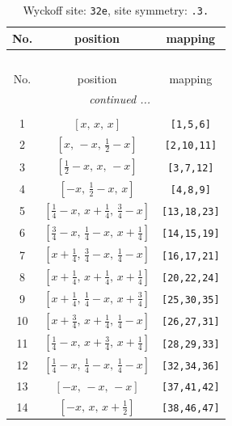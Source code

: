 \documentclass[fleqn,8pt]{jsarticle}
\begin{document}
\renewcommand{\arraystretch}{1.2}
\begin{longtable}{ccc}
\caption{Wyckoff site: {\tt 32e}, site symmetry: {\tt .3.}}
 \\
 \hline \hline
No. & position & mapping \\ \hline \endfirsthead

\multicolumn{2}{l}{\tablename\ \thetable{}} \\
 \hline \hline
No. & position & mapping \\ \hline \endhead

 \hline \hline
\multicolumn{2}{r}{\footnotesize\it continued ...} \\ \endfoot

 \hline \hline
\multicolumn{2}{r}{} \\ \endlastfoot

1 & $\left[ x,\, x,\, x \right]$ & {\tt [1,5,6]} \\ \hline
2 & $\left[ x,\, - x,\, \frac{1}{2} - x \right]$ & {\tt [2,10,11]} \\ \hline
3 & $\left[ \frac{1}{2} - x,\, x,\, - x \right]$ & {\tt [3,7,12]} \\ \hline
4 & $\left[ - x,\, \frac{1}{2} - x,\, x \right]$ & {\tt [4,8,9]} \\ \hline
5 & $\left[ \frac{1}{4} - x,\, x + \frac{1}{4},\, \frac{3}{4} - x \right]$ & {\tt [13,18,23]} \\ \hline
6 & $\left[ \frac{3}{4} - x,\, \frac{1}{4} - x,\, x + \frac{1}{4} \right]$ & {\tt [14,15,19]} \\ \hline
7 & $\left[ x + \frac{1}{4},\, \frac{3}{4} - x,\, \frac{1}{4} - x \right]$ & {\tt [16,17,21]} \\ \hline
8 & $\left[ x + \frac{1}{4},\, x + \frac{1}{4},\, x + \frac{1}{4} \right]$ & {\tt [20,22,24]} \\ \hline
9 & $\left[ x + \frac{1}{4},\, \frac{1}{4} - x,\, x + \frac{3}{4} \right]$ & {\tt [25,30,35]} \\ \hline
10 & $\left[ x + \frac{3}{4},\, x + \frac{1}{4},\, \frac{1}{4} - x \right]$ & {\tt [26,27,31]} \\ \hline
11 & $\left[ \frac{1}{4} - x,\, x + \frac{3}{4},\, x + \frac{1}{4} \right]$ & {\tt [28,29,33]} \\ \hline
12 & $\left[ \frac{1}{4} - x,\, \frac{1}{4} - x,\, \frac{1}{4} - x \right]$ & {\tt [32,34,36]} \\ \hline
13 & $\left[ - x,\, - x,\, - x \right]$ & {\tt [37,41,42]} \\ \hline
14 & $\left[ - x,\, x,\, x + \frac{1}{2} \right]$ & {\tt [38,46,47]} \\ \hline

\end{longtable}
\end{document}
